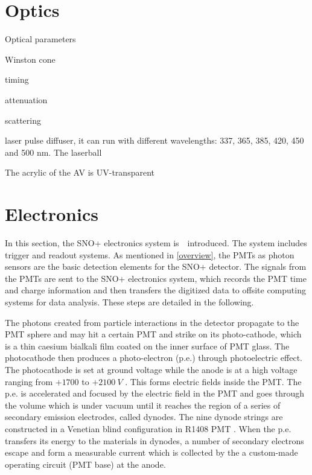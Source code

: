 \section{Optics}

Optical parameters

Winston cone



timing


attenuation

scattering


laser pulse diffuser, it can run with different wavelengths: 337, 365, 385, 420, 450 and 500 nm.
The laserball 

The acrylic of the AV is UV-transparent

\section{Electronics}
In this section, the SNO+ electronics system is　introduced. The system includes trigger and readout systems. As mentioned in \ref{overview}, the PMTs as photon sensors are the basic detection elements for the SNO+ detector. The signals from the PMTs are sent to the SNO+ electronics system, which records the PMT time and charge information and then transfers the digitized data to offsite computing systems for data analysis. These steps are detailed in the following.

The photons created from particle interactions in the detector propagate to the PMT sphere and may hit a certain PMT and strike on its photo-cathode, which is a thin caesium bialkali film coated on the inner surface of PMT glass. The photocathode then produces a photo-electron (p.e.) through photoelectric effect. The photocathode is set at ground voltage while the anode is at a high voltage ranging from $+1700$ to $+2100~V$ \cite{boger2000sudbury,dunger2018topological}. This forms electric fields inside the PMT. The p.e. is accelerated and focused by the electric field in the PMT and goes through the volume which is under vacuum until it reaches the region of a series of secondary emission electrodes, called dynodes. The nine dynode strings are constructed in a Venetian blind configuration in R1408 PMT \cite{boger2000sudbury,leo2012techniques}. When the p.e. transfers its energy to the materials in dynodes, a number of secondary electrons escape and form a measurable current which is collected by the a custom-made operating circuit (PMT base) at the anode\cite{hamamatsu2018photomultiplier}.

